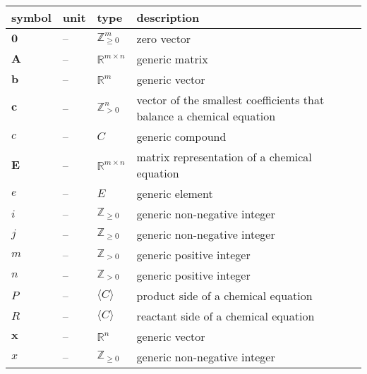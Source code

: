 \documentclass[12pt]{article}
\newcommand*{\nonnegInt}{\mathbb{Z}_{\geq 0}}
\newcommand*{\posInt}{\mathbb{Z}_{> 0}}
\begin{document}
\noindent \begin{tabularx}{\textwidth}{l l l X} \toprule
  \textbf{symbol} & \textbf{unit} & \textbf{type}             & \textbf{description}                         \\
  \midrule
  $\textbf{0}$    & --            & $\nonnegInt^{m}$          & zero vector                                  \\
  $\textbf{A}$    & --            & $\mathbb{R}^{m \times n}$ & generic matrix                               \\
  $\textbf{b}$    & --            & $\mathbb{R}^{m}$          & generic vector                               \\
  $\textbf{c}$    & --            & $\posInt^{n}$             & vector of the smallest coefficients
  that balance a chemical equation                                                                           \\
  $c$             & --            & $C$                       & generic compound                             \\
  $\textbf{E}$    & --            & $\mathbb{R}^{m \times n}$ & matrix representation of a chemical equation \\
  $e$             & --            & $E$                       & generic element                              \\
  $i$             & --            & $\nonnegInt$              & generic non-negative integer                 \\
  $j$             & --            & $\nonnegInt$              & generic non-negative integer                 \\
  $m$             & --            & $\posInt$                 & generic positive integer                     \\
  $n$             & --            & $\posInt$                 & generic positive integer                     \\
  $P$             & --            & $\langle C \rangle$       & product side of a chemical equation          \\
  $R$             & --            & $\langle C \rangle$       & reactant side of a chemical equation         \\
  $\textbf{x}$    & --            & $\mathbb{R}^{n}$          & generic vector                               \\
  $x$             & --            & $\nonnegInt$              & generic non-negative integer                 \\
  \bottomrule
\end{tabularx}
\end{document}
